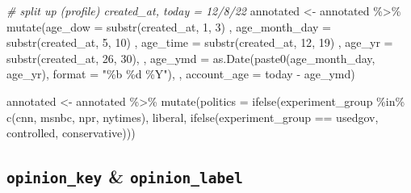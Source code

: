 \documentclass[
]{article}
\newenvironment{Shaded}{\begin{snugshade}}{\end{snugshade}}
\newcommand{\AttributeTok}[1]{\textcolor[rgb]{0.77,0.63,0.00}{#1}}
\newcommand{\CommentTok}[1]{\textcolor[rgb]{0.56,0.35,0.01}{\textit{#1}}}
\newcommand{\DecValTok}[1]{\textcolor[rgb]{0.00,0.00,0.81}{#1}}
\newcommand{\FunctionTok}[1]{\textcolor[rgb]{0.00,0.00,0.00}{#1}}
\newcommand{\NormalTok}[1]{#1}
\newcommand{\OtherTok}[1]{\textcolor[rgb]{0.56,0.35,0.01}{#1}}
\newcommand{\SpecialCharTok}[1]{\textcolor[rgb]{0.00,0.00,0.00}{#1}}
\newcommand{\StringTok}[1]{\textcolor[rgb]{0.31,0.60,0.02}{#1}}
\begin{document}
\begin{Shaded}
\begin{Highlighting}[]
\CommentTok{\# split up (profile) created\_at, today = 12/8/22}
\NormalTok{annotated }\OtherTok{\textless{}{-}}\NormalTok{ annotated }\SpecialCharTok{\%\textgreater{}\%} \FunctionTok{mutate}\NormalTok{(}\AttributeTok{age\_dow =} \FunctionTok{substr}\NormalTok{(created\_at, }\DecValTok{1}\NormalTok{, }\DecValTok{3}\NormalTok{)}
\NormalTok{                              , }\AttributeTok{age\_month\_day =} \FunctionTok{substr}\NormalTok{(created\_at, }\DecValTok{5}\NormalTok{, }\DecValTok{10}\NormalTok{)}
\NormalTok{                              , }\AttributeTok{age\_time =} \FunctionTok{substr}\NormalTok{(created\_at, }\DecValTok{12}\NormalTok{, }\DecValTok{19}\NormalTok{)}
\NormalTok{                              , }\AttributeTok{age\_yr =} \FunctionTok{substr}\NormalTok{(created\_at, }\DecValTok{26}\NormalTok{, }\DecValTok{30}\NormalTok{), }
\NormalTok{                              , }\AttributeTok{age\_ymd =} \FunctionTok{as.Date}\NormalTok{(}\FunctionTok{paste0}\NormalTok{(age\_month\_day, age\_yr), }\AttributeTok{format =} \StringTok{"\%b \%d \%Y"}\NormalTok{),}
\NormalTok{                              , }\AttributeTok{account\_age =}\NormalTok{ today }\SpecialCharTok{{-}}\NormalTok{ age\_ymd)}

\NormalTok{annotated }\OtherTok{\textless{}{-}}\NormalTok{ annotated }\SpecialCharTok{\%\textgreater{}\%} \FunctionTok{mutate}\NormalTok{(}\AttributeTok{politics =} \FunctionTok{ifelse}\NormalTok{(experiment\_group }\SpecialCharTok{\%in\%} \FunctionTok{c}\NormalTok{(}\StringTok{\textquotesingle{}cnn\textquotesingle{}}\NormalTok{, }\StringTok{\textquotesingle{}msnbc\textquotesingle{}}\NormalTok{, }\StringTok{\textquotesingle{}npr\textquotesingle{}}\NormalTok{, }\StringTok{\textquotesingle{}nytimes\textquotesingle{}}\NormalTok{), }\StringTok{\textquotesingle{}liberal\textquotesingle{}}\NormalTok{, }
                           \FunctionTok{ifelse}\NormalTok{(experiment\_group }\SpecialCharTok{==} \StringTok{\textquotesingle{}usedgov\textquotesingle{}}\NormalTok{, }\StringTok{\textquotesingle{}controlled\textquotesingle{}}\NormalTok{, }\StringTok{\textquotesingle{}conservative\textquotesingle{}}\NormalTok{)))}
\end{Highlighting}
\end{Shaded}

\hypertarget{opinion_key-opinion_label}{%
\subsection{\texorpdfstring{\texttt{opinion\_key} \&
\texttt{opinion\_label}}{opinion\_key \& opinion\_label}}\label{opinion_key-opinion_label}}
\end{document}
